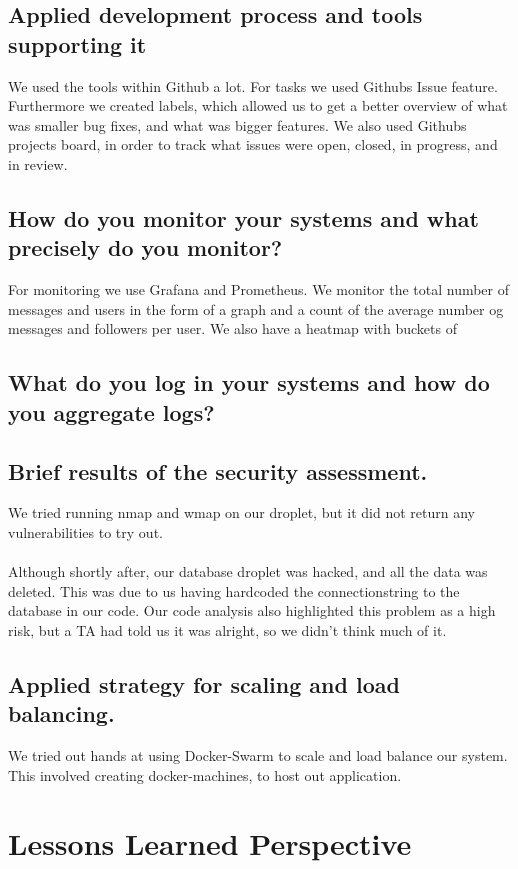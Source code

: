 \documentclass{article}
\begin{document}
\subsection{Applied development process and tools supporting it}
We used the tools within Github a lot. For tasks we used Githubs Issue feature. Furthermore we created labels, which allowed us to get a better overview of what was smaller bug fixes, and what was bigger features. We also used Githubs projects board, in order to track what issues were open, closed, in progress, and in review.

\subsection{How do you monitor your systems and what precisely do you monitor?}
For monitoring we use Grafana and Prometheus. We monitor the total number of messages and users in the form of a graph and a count of the average number og messages and followers per user. We also have a heatmap with buckets of 

\subsection{What do you log in your systems and how do you aggregate logs?}


\subsection{Brief results of the security assessment.}
We tried running nmap and wmap on our droplet, but it did not return any vulnerabilities to try out.
\\\\
Although shortly after, our database droplet was hacked, and all the data was deleted. This was due to us having hardcoded the connectionstring to the database in our code. Our code analysis also highlighted this problem as a high risk, but a TA had told us it was alright, so we didn't think much of it.

\subsection{Applied strategy for scaling and load balancing.}
We tried out hands at using Docker-Swarm to scale and load balance our system. This involved creating docker-machines, to host out application. 

\section{Lessons Learned Perspective}
\end{document}
